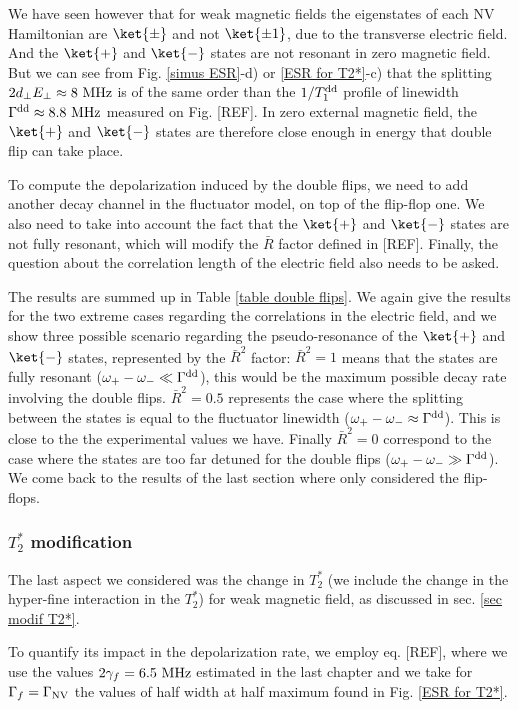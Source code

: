 \documentclass[a4paper,11pt]{report}
\begin{document}
\begin{refsection}
We have seen however that for weak magnetic fields the eigenstates of each NV Hamiltonian are $\ket{\pm}$ and not $\ket{\pm 1}$, due to the transverse electric field. And the $\ket{+}$ and $\ket{-}$ states are not resonant in zero magnetic field. But we can see from Fig. \ref{simus ESR}-d) or \ref{ESR for T2*}-c) that the splitting $2 d_\perp E_\perp \approx 8\ \rm MHz$ is of the same order than the $1/T_1^{\rm dd}$ profile of linewidth $\Gamma^{\rm dd} \approx 8.8\ \rm MHz$ measured on Fig. [REF]. In zero external magnetic field, the $\ket{+}$ and $\ket{-}$ states are therefore close enough in energy that double flip can take place.

To compute the depolarization induced by the double flips, we need to add another decay channel in the fluctuator model, on top of the flip-flop one. We also need to take into account the fact that the $\ket{+}$ and $\ket{-}$ states are not fully resonant, which will modify the $\bar{R}$ factor defined in [REF]. Finally, the question about the correlation  length of the electric field also needs to be asked.

The results are summed up in Table \ref{table double flips}. We again give the results for the two extreme cases regarding the correlations in the electric field, and we show three possible scenario regarding the pseudo-resonance of the $\ket{+}$ and $\ket{-}$ states, represented by the $\bar{R}^2$ factor: $\bar{R}^2=1$ means that the states are fully resonant ($\omega_+-\omega_- \ll \Gamma^{\rm dd} $), this would be the maximum possible decay rate involving the double flips. $\bar{R}^2=0.5$ represents the case where the splitting between the states is equal to the fluctuator linewidth ($\omega_+-\omega_- \approx \Gamma^{\rm dd}$). This is close to the the experimental values we have. Finally $\bar{R}^2=0$ correspond to the case where the states are too far detuned for the double flips ($\omega_+-\omega_- \gg \Gamma^{\rm dd} $). We come back to the results of the last section where only considered the flip-flops.


\subsubsection{$T_2^*$ modification}

The last aspect we considered was the change in $T_2^*$ (we include the change in the hyper-fine interaction in the $T_2^*$) for weak magnetic field, as discussed in sec. \ref{sec modif T2*}.

To quantify its impact in the depolarization rate, we employ eq. [REF], where we use the values $2\gamma_f = 6.5\ \rm MHz$ estimated in the last chapter and we take for $\Gamma_f=\Gamma_{\rm NV}$ the values of half width at half maximum found in Fig. \ref{ESR for T2*}. 


\end{refsection}
\end{document}

